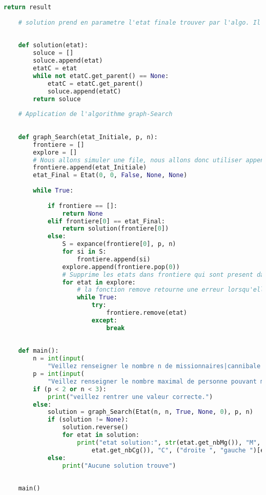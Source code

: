 \documentclass[a4paper, 12pt, french,oneside]{book}
\begin{document}
\begin{lstlisting}[language=Python, caption=Python example]
        return result
    
    # solution prend en parametre l'etat finale trouver par l'algo. Il retournera un liste de tous les parents de la solution. (La racine a la variable parent def a None)
    
    
    def solution(etat):
        soluce = []
        soluce.append(etat)
        etatC = etat
        while not etatC.get_parent() == None:
            etatC = etatC.get_parent()
            soluce.append(etatC)
        return soluce
    
    # Application de l'algorithme graph-Search
    
    
    def graph_Search(etat_Initiale, p, n):
        frontiere = []
        explore = []
        # Nous allons simuler une file, nous allons donc utiliser append qui rajoute l'objet en fin de file et l'etat choisie a expancer sera celui en t^te de file (donc a la position 0)
        frontiere.append(etat_Initiale)
        etat_Final = Etat(0, 0, False, None, None)
    
        while True:
    
            if frontiere == []:
                return None
            elif frontiere[0] == etat_Final:
                return solution(frontiere[0])
            else:
                S = expance(frontiere[0], p, n)
                for si in S:
                    frontiere.append(si)
                explore.append(frontiere.pop(0))
                # Supprime les etats dans frontiere qui sont present dans eplorer (donc les etas deja expance)
                for etat in explore:
                    # la fonction remove retourne une erreur lorsqu'elle ne trouve pas l'element a supprimer dans la file. On va donc capter cette erreur pour eviter de faire "while etat in frontiere". Ce qui nous obligerais a chaque fois de parcourire la file pour s'avoir s'il y a un etat correspondant a "etat".
                    while True:
                        try:
                            frontiere.remove(etat)
                        except:
                            break
    
    
    def main():
        n = int(input(
            "Veillez renseigner le nombre n de missionnaires|cannibale a faires traverser (minimum 3): "))
        p = int(input(
            "Veillez renseigner le nombre maximal de personne pouvant monter sur le bateau (au mininimum 2) : "))
        if (p < 2 or n < 3):
            print("veillez rentrer une valeur correcte.")
        else:
            solution = graph_Search(Etat(n, n, True, None, 0), p, n)
            if (solution != None):
                solution.reverse()
                for etat in solution:
                    print("etat solution:", str(etat.get_nbMg()), "M", str(
                        etat.get_nbCg()), "C", ("droite ", "gauche ")[etat.get_boatPosition()], str(etat.get_cout()))
            else:
                print("Aucune solution trouve")
    
    
    main()
    
\end{lstlisting}

\backmatter
\end{document}
